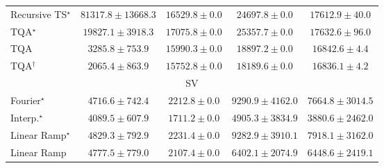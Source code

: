 \begin{tabular}{l|cccc|}
Recursive TS$^\star$ & {\cellcolor[HTML]{004529}} \color[HTML]{F1F1F1} $81317.8\pm 13668.3$ & {\cellcolor[HTML]{DAF0A4}} \color[HTML]{000000} $16529.8\pm 0.0$ & {\cellcolor[HTML]{B8E293}} \color[HTML]{000000} $24697.8\pm 0.0$ & {\cellcolor[HTML]{D5EEA1}} \color[HTML]{000000} $17612.9\pm 40.0$ \\
TQA$^\star$ & {\cellcolor[HTML]{CCEA9D}} \color[HTML]{000000} $19827.1\pm 3918.3$ & {\cellcolor[HTML]{D7EFA2}} \color[HTML]{000000} $17075.8\pm 0.0$ & {\cellcolor[HTML]{B6E192}} \color[HTML]{000000} $25357.7\pm 0.0$ & {\cellcolor[HTML]{D5EEA1}} \color[HTML]{000000} $17632.6\pm 96.0$ \\
TQA & {\cellcolor[HTML]{F9FDC4}} \color[HTML]{000000} $3285.8\pm 753.9$ & {\cellcolor[HTML]{DBF1A4}} \color[HTML]{000000} $15990.3\pm 0.0$ & {\cellcolor[HTML]{D0EC9F}} \color[HTML]{000000} $18897.2\pm 0.0$ & {\cellcolor[HTML]{D9F0A3}} \color[HTML]{000000} $16842.6\pm 4.4$ \\
TQA$^\dagger$ & {\cellcolor[HTML]{FAFDC9}} \color[HTML]{000000} $2065.4\pm 863.9$ & {\cellcolor[HTML]{DCF1A5}} \color[HTML]{000000} $15752.8\pm 0.0$ & {\cellcolor[HTML]{D3EDA0}} \color[HTML]{000000} $18189.6\pm 0.0$ & {\cellcolor[HTML]{D9F0A3}} \color[HTML]{000000} $16836.1\pm 4.2$ \\
\cline{1-5}
\multicolumn{5}{c}{\rule{0pt}{8pt}SV} \\
\midrule
Fourier$^\star$ & {\cellcolor[HTML]{9EBAD9}} \color[HTML]{000000} $4716.6\pm 742.4$ & {\cellcolor[HTML]{F5EFF6}} \color[HTML]{000000} $2212.8\pm 0.0$ & {\cellcolor[HTML]{023858}} \color[HTML]{F1F1F1} $9290.9\pm 4162.0$ & {\cellcolor[HTML]{0569A5}} \color[HTML]{F1F1F1} $7664.8\pm 3014.5$ \\
Interp.$^\star$ & {\cellcolor[HTML]{BBC7E0}} \color[HTML]{000000} $4089.5\pm 607.9$ & {\cellcolor[HTML]{FFF7FB}} \color[HTML]{000000} $1711.2\pm 0.0$ & {\cellcolor[HTML]{94B6D7}} \color[HTML]{000000} $4905.3\pm 3834.9$ & {\cellcolor[HTML]{C4CBE3}} \color[HTML]{000000} $3880.6\pm 2462.0$ \\
Linear Ramp$^\star$ & {\cellcolor[HTML]{97B7D7}} \color[HTML]{000000} $4829.3\pm 792.9$ & {\cellcolor[HTML]{F5EEF6}} \color[HTML]{000000} $2231.4\pm 0.0$ & {\cellcolor[HTML]{023858}} \color[HTML]{F1F1F1} $9282.9\pm 3910.1$ & {\cellcolor[HTML]{04649D}} \color[HTML]{F1F1F1} $7918.1\pm 3162.0$ \\
Linear Ramp & {\cellcolor[HTML]{9AB8D8}} \color[HTML]{000000} $4777.5\pm 779.0$ & {\cellcolor[HTML]{F7F0F7}} \color[HTML]{000000} $2107.4\pm 0.0$ & {\cellcolor[HTML]{3991C1}} \color[HTML]{F1F1F1} $6402.1\pm 2074.9$ & {\cellcolor[HTML]{358FC0}} \color[HTML]{F1F1F1} $6448.6\pm 2419.1$ \\

\end{tabular}
